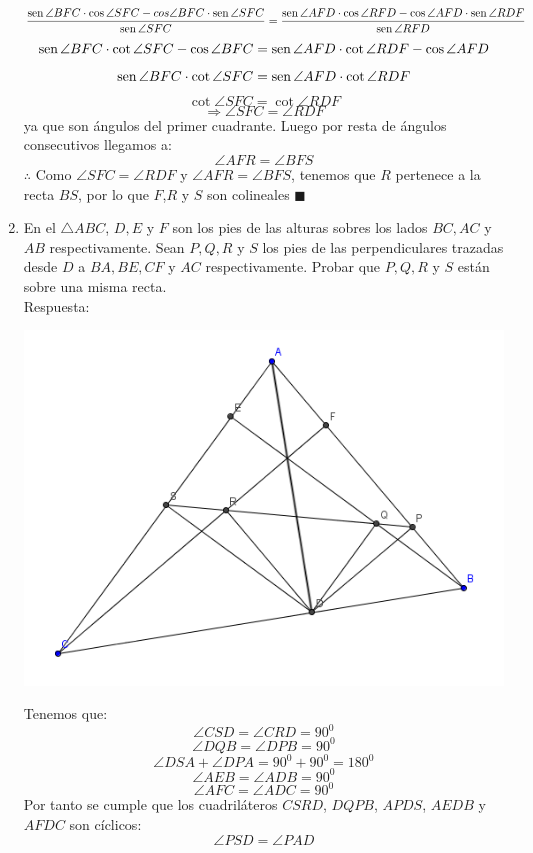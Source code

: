 \documentclass{book}
\newcommand{\sen}{\mathop{\rm sen}\nolimits} %
\begin{document}
\begin{enumerate}
$$\frac{\sen{\angle BFC}\cdot\cos{\angle SFC}-cos{\angle BFC}\cdot\sen {\angle SFC}}{\sen{\angle SFC}}=\frac{\sen{\angle AFD}\cdot\cos{\angle RFD}-\cos{\angle AFD}\cdot\sen{\angle RDF}}{\sen{\angle RFD}}$$
$$\sen {\angle BFC}\cdot\cot{\angle SFC}-\cos{\angle BFC}=\sen {\angle AFD}\cdot\cot{\angle RDF}-\cos{\angle AFD}$$
$$\sen {\angle BFC}\cdot\cot{\angle SFC}=\sen {\angle AFD}\cdot\cot{\angle RDF}$$
$$\cot{\angle SFC}=\cot{\angle RDF}$$
$$\Rightarrow\angle SFC=\angle RDF$$
ya que son ángulos del primer cuadrante. Luego por resta de ángulos consecutivos llegamos a:
$$\angle AFR=\angle BFS$$
$\therefore$ Como $\angle SFC=\angle RDF$ y $\angle AFR=\angle BFS$, tenemos que $R$ pertenece a la recta $BS$, por lo que $F$,$R$ y $S$ son colineales  $\blacksquare$\\ 
				\item En el $\triangle ABC$, $D ,E$ y $F$ son los pies de las alturas sobres los lados $BC,AC$ y $AB$ respectivamente. Sean $P,Q,R$ y $S$ los pies de las perpendiculares trazadas desde $D$ a $BA, BE, CF$ y $AC$ respectivamente. Probar que $P, Q, R$ y $S$ están sobre una misma recta.\\
					Respuesta:
					\begin{center}
						\includegraphics[scale=1]{imagenes/Geometria/16.png}
					\end{center}
					Tenemos que:
$$\angle CSD=\angle CRD=90^0$$
$$\angle DQB=\angle DPB=90^0$$
$$\angle DSA+\angle DPA=90^0+90^0=180^0$$
$$\angle AEB=\angle ADB=90^0$$
$$\angle AFC=\angle ADC=90^ 0$$
Por tanto se cumple que los cuadriláteros $CSRD$, $DQPB$, $APDS$, $AEDB$ y $AFDC$ son cíclicos:
$$\angle PSD=\angle PAD$$

\end{enumerate}
\end{document}

